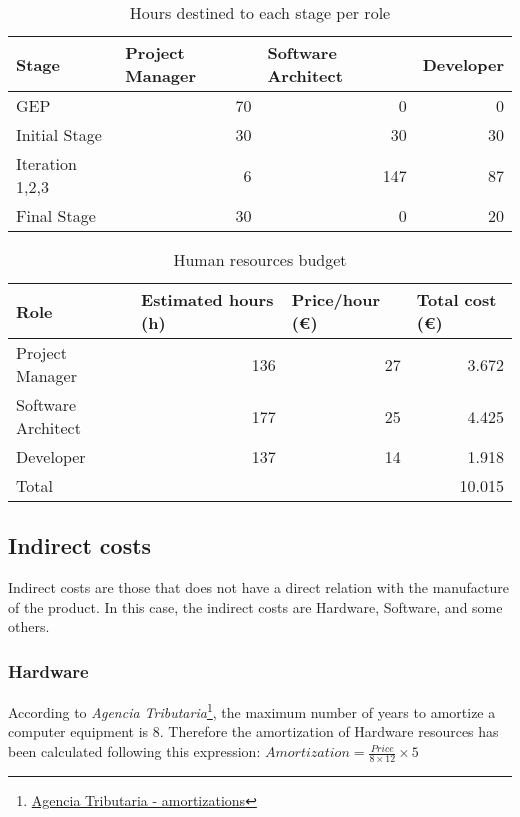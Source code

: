 \begin{table}[h!]
	\centering
	\begin{tabular}{|l|r|r|r|}
		\hline
		Stage & \multicolumn{1}{l|}{Project Manager} & \multicolumn{1}{l|}{Software Architect} & \multicolumn{1}{l|}{Developer} \\ \hline
		GEP & 70 & 0 & 0 \\ \hline
		Initial Stage & 30 & 30 & 30 \\ \hline
		Iteration 1,2,3 & 6 & 147 & 87 \\ \hline
		Final Stage & 30 & 0 & 20 \\ \hline
	\end{tabular}
	\caption{Hours destined to each stage per role}
	\label{StageResources}
\end{table}
\begin{table}[h!]
	\centering
	\begin{tabular}{|l|r|r|r|}
		\hline
		Role & \multicolumn{1}{l|}{Estimated hours (h)} & \multicolumn{1}{l|}{Price/hour (€)} & \multicolumn{1}{l|}{Total cost (€)} \\ \hline
		Project Manager & 136 & 27  & 3.672 \\ \hline
		Software Architect & 177 & 25 & 4.425 \\ \hline
		Developer & 137 & 14 & 1.918 \\ \hline\hline
		Total & \multicolumn{3}{r|}{10.015} \\ \hline
	\end{tabular}
	\caption{Human resources budget}
	\label{HumanResources}
\end{table}

\subsection{Indirect costs}
Indirect costs are those that does not have a direct relation with the manufacture of the product. In this case, the indirect costs are Hardware, Software, and some others. 

\subsubsection{Hardware}

According to \emph{Agencia Tributaria}\footnote{\href{http://www.agenciatributaria.es/AEAT.internet/en_gb/Inicio/_Segmentos_/Empresas_y_profesionales/Empresas/Impuesto_sobre_Sociedades/Periodos_impositivos_a_partir_de_1_1_2015/Base_imponible/Amortizacion/Tabla_de_coeficientes_de_amortizacion_lineal_.shtml} {Agencia Tributaria - amortizations}}, the maximum number of years to amortize a computer equipment is 8. Therefore the amortization of Hardware resources has been calculated following this expression: $Amortization = \frac{Price}{8\times12} \times 5$

